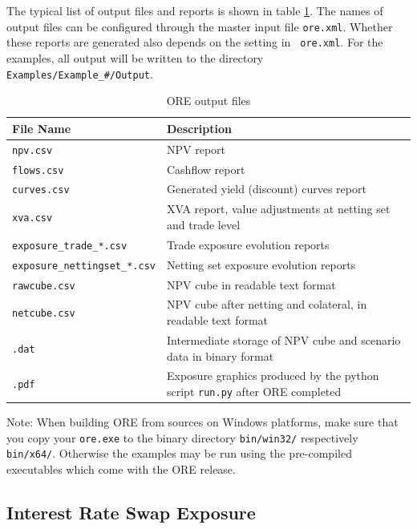 \documentclass[12pt, a4paper]{article}
\begin{document}
The typical list of output files and reports is shown in table \ref{tab_2}. The names of output files can be configured
through the master input file {\tt ore.xml}. Whether these reports are generated also depends on the setting in {\tt
  ore.xml}. For the examples, all output will be written to the directory {\tt Examples/Example\_\#/Output}.

\begin{table}[h]
\scriptsize
\begin{center}
\begin{tabular}{|l|p{11cm}|}
\hline
File Name & Description \\
\hline
{\tt npv.csv}&   NPV report \\
{\tt flows.csv} & Cashflow report \\
{\tt curves.csv} & Generated yield (discount) curves report \\
{\tt xva.csv} & XVA report, value adjustments at netting set and trade level \\
{\tt exposure\_trade\_*.csv} & Trade exposure evolution reports\\
{\tt exposure\_nettingset\_*.csv} &  Netting set exposure evolution reports\\
{\tt rawcube.csv} & NPV cube in readable text format \\
{\tt netcube.csv} & NPV cube after netting and colateral, in readable text format \\
{\tt *.dat} & Intermediate storage of NPV cube and scenario data in binary format \\
{\tt *.pdf} &  Exposure graphics produced by the python script {\tt run.py} after ORE completed\\
\hline
\end{tabular}
\end{center}
\caption{ORE output files}
\label{tab_2}
\end{table}

Note: When building ORE from sources on Windows platforms, make sure that you copy your {\tt ore.exe} to the binary
directory {\tt bin/win32/} respectively {\tt bin/x64/}. Otherwise the examples may be run using the pre-compiled
executables which come with the ORE release.

\subsection{Interest Rate Swap Exposure}\label{sec:example1}
\end{document}
